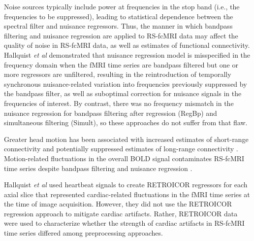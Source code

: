 \documentclass[twoside,twocolumn]{article}
\begin{document}
Noise sources typically include power at frequencies in the stop band (i.e., the frequencies to be suppressed), leading to statistical dependence between the spectral ﬁlter and nuisance regressors.  Thus, the manner in which bandpass ﬁltering and nuisance regression are applied to RS-fcMRI data may affect the quality of noise in RS-fcMRI data, as well as estimates of functional connectivity.  Hallquist {\em et al}\cite{Hallquist2013} demonstrated that nuisance regression model is misspeciﬁed in the frequency domain when the fMRI time series are bandpass ﬁltered but one or more regressors are unﬁltered, resulting in the reintroduction of temporally synchronous nuisance-related variation into frequencies previously suppressed by the bandpass ﬁlter, as well as suboptimal correction for nuisance signals in the frequencies of interest. By contrast, there was no frequency mismatch in the nuisance regression for bandpass ﬁltering after regression (RegBp) and simultaneous ﬁltering (Simult), so these approaches do not suffer from that ﬂaw.

Greater head motion has been associated with increased estimates of short-range connectivity and potentially suppressed estimates of long-range connectivity \cite{Hallquist2013}.  Motion-related ﬂuctuations in the overall BOLD signal contaminates RS-fcMRI time series despite bandpass ﬁltering and nuisance regression \cite{Power2012}. 

Hallquist {\em et al}\cite{Hallquist2013} used heartbeat signals to create RETROICOR regressors for each axial slice that represented cardiac-related ﬂuctuations in the fMRI time series at the time of image acquisition.  However, they did not use the RETROICOR regression approach to mitigate cardiac artifacts. Rather, RETROICOR data were used to characterize whether the strength of cardiac artifacts in RS-fcMRI time series differed among preprocessing approaches. 
\end{document}
